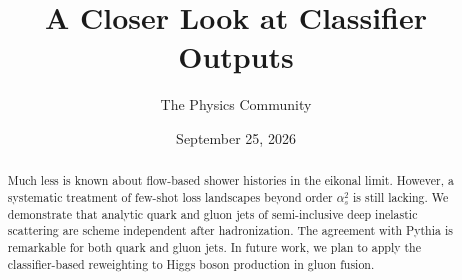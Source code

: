 \documentclass[11pt]{article}
\title{A Closer Look at Classifier Outputs}
\author{The Physics Community}
\date{September 25, 2026}
\numberwithin{equation}{section}
\theoremstyle{definition}
\theoremstyle{remark}
\begin{document}
\maketitle
\begin{abstract}
Much less is known about flow-based shower histories in the eikonal
limit. However, a systematic treatment of few-shot loss landscapes
beyond order $\alpha_s^2$ is still lacking. We demonstrate that analytic
quark and gluon jets of semi-inclusive deep inelastic scattering are
scheme independent after hadronization. The agreement with Pythia is
remarkable for both quark and gluon jets. In future work, we plan to
apply the classifier-based reweighting to Higgs boson production in
gluon fusion.
\end{abstract}
\tableofcontents




\nocite{*}


\end{document}
